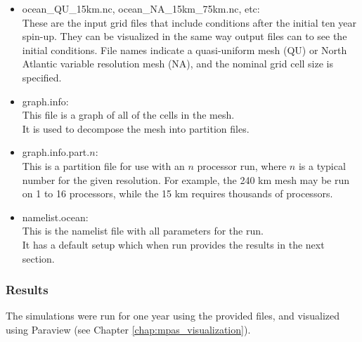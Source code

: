 \begin{itemize}
	\item ocean\_QU\_15km.nc, ocean\_NA\_15km\_75km.nc, etc: \\
		These are the input grid files that include conditions after the initial ten year spin-up. They can be visualized in the same way output files can to see the initial conditions. File names indicate a quasi-uniform mesh (QU) or North Atlantic variable resolution mesh (NA), and the nominal grid cell size is specified.
	\item graph.info: \\
		This file is a graph of all of the cells in the mesh. \\
		It is used to decompose the mesh into partition files.
	\item graph.info.part.$n$: \\
		This is a partition file for use with an $n$ processor run, where $n$ is a typical number for the given resolution.  For example, the 240 km mesh may be run on 1 to 16 processors, while the 15 km requires thousands of processors.
	\item namelist.ocean: \\
		This is the namelist file with all parameters for the run. \\
		It has a default setup which when run provides the results in the next section.
\end{itemize}

\subsubsection{Results}
\label{subsubsec:realWorld_results}

The simulations were run for one year using the provided files, and visualized using Paraview (see Chapter \ref{chap:mpas_visualization}).

